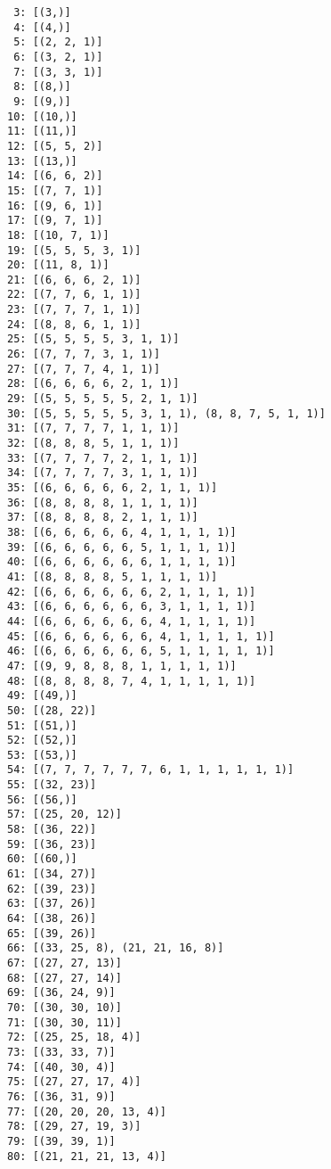 \documentclass[11pt]{article}
\begin{document}
\begin{verbatim}
 3: [(3,)]
 4: [(4,)]
 5: [(2, 2, 1)]
 6: [(3, 2, 1)]
 7: [(3, 3, 1)]
 8: [(8,)]
 9: [(9,)]
10: [(10,)]
11: [(11,)]
12: [(5, 5, 2)]
13: [(13,)]
14: [(6, 6, 2)]
15: [(7, 7, 1)]
16: [(9, 6, 1)]
17: [(9, 7, 1)]
18: [(10, 7, 1)]
19: [(5, 5, 5, 3, 1)]
20: [(11, 8, 1)]
21: [(6, 6, 6, 2, 1)]
22: [(7, 7, 6, 1, 1)]
23: [(7, 7, 7, 1, 1)]
24: [(8, 8, 6, 1, 1)]
25: [(5, 5, 5, 5, 3, 1, 1)]
26: [(7, 7, 7, 3, 1, 1)]
27: [(7, 7, 7, 4, 1, 1)]
28: [(6, 6, 6, 6, 2, 1, 1)]
29: [(5, 5, 5, 5, 5, 2, 1, 1)]
30: [(5, 5, 5, 5, 5, 3, 1, 1), (8, 8, 7, 5, 1, 1)]
31: [(7, 7, 7, 7, 1, 1, 1)]
32: [(8, 8, 8, 5, 1, 1, 1)]
33: [(7, 7, 7, 7, 2, 1, 1, 1)]
34: [(7, 7, 7, 7, 3, 1, 1, 1)]
35: [(6, 6, 6, 6, 6, 2, 1, 1, 1)]
36: [(8, 8, 8, 8, 1, 1, 1, 1)]
37: [(8, 8, 8, 8, 2, 1, 1, 1)]
38: [(6, 6, 6, 6, 6, 4, 1, 1, 1, 1)]
39: [(6, 6, 6, 6, 6, 5, 1, 1, 1, 1)]
40: [(6, 6, 6, 6, 6, 6, 1, 1, 1, 1)]
41: [(8, 8, 8, 8, 5, 1, 1, 1, 1)]
42: [(6, 6, 6, 6, 6, 6, 2, 1, 1, 1, 1)]
43: [(6, 6, 6, 6, 6, 6, 3, 1, 1, 1, 1)]
44: [(6, 6, 6, 6, 6, 6, 4, 1, 1, 1, 1)]
45: [(6, 6, 6, 6, 6, 6, 4, 1, 1, 1, 1, 1)]
46: [(6, 6, 6, 6, 6, 6, 5, 1, 1, 1, 1, 1)]
47: [(9, 9, 8, 8, 8, 1, 1, 1, 1, 1)]
48: [(8, 8, 8, 8, 7, 4, 1, 1, 1, 1, 1)]
49: [(49,)]
50: [(28, 22)]
51: [(51,)]
52: [(52,)]
53: [(53,)]
54: [(7, 7, 7, 7, 7, 7, 6, 1, 1, 1, 1, 1, 1)]
55: [(32, 23)]
56: [(56,)]
57: [(25, 20, 12)]
58: [(36, 22)]
59: [(36, 23)]
60: [(60,)]
61: [(34, 27)]
62: [(39, 23)]
63: [(37, 26)]
64: [(38, 26)]
65: [(39, 26)]
66: [(33, 25, 8), (21, 21, 16, 8)]
67: [(27, 27, 13)]
68: [(27, 27, 14)]
69: [(36, 24, 9)]
70: [(30, 30, 10)]
71: [(30, 30, 11)]
72: [(25, 25, 18, 4)]
73: [(33, 33, 7)]
74: [(40, 30, 4)]
75: [(27, 27, 17, 4)]
76: [(36, 31, 9)]
77: [(20, 20, 20, 13, 4)]
78: [(29, 27, 19, 3)]
79: [(39, 39, 1)]
80: [(21, 21, 21, 13, 4)]
\end{verbatim}
\end{document}
